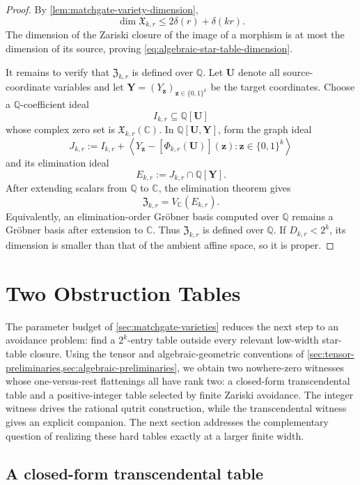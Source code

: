 \documentclass[11pt]{article}
\theoremstyle{definition}
\theoremstyle{remark}
\newcommand{\C}{\mathbb C}
\newcommand{\Q}{\mathbb Q}
\newcommand{\bits}{\{0,1\}}
\begin{document}
\begin{proof}
By \cref{lem:matchgate-variety-dimension},
\[
  \dim\mathfrak X_{k,r}
  \le2\delta(r)+\delta(kr).
\]
The dimension of the Zariski closure of the image of a morphism is at most
the dimension of its source, proving
\eqref{eq:algebraic-star-table-dimension}.

It remains to verify that $\mathfrak Z_{k,r}$ is defined over $\Q$.
Let $\mathbf U$ denote all source-coordinate variables and let
$\mathbf Y=(Y_{\boldsymbol z})_{\boldsymbol z\in\bits^k}$ be the target
coordinates.  Choose a
$\Q$-coefficient ideal
\[
  I_{k,r}\subseteq\Q[\mathbf U]
\]
whose complex zero set is $\mathfrak X_{k,r}(\C)$.  In
$\Q[\mathbf U,\mathbf Y]$, form the graph ideal
\[
  J_{k,r}
  :=I_{k,r}
  +\left\langle
    Y_{\boldsymbol z}-[\Phi_{k,r}(\mathbf U)](\boldsymbol z)
    :\boldsymbol z\in\bits^k
  \right\rangle
\]
and its elimination ideal
\[
  E_{k,r}:=J_{k,r}\cap\Q[\mathbf Y].
\]
After extending scalars from $\Q$ to $\C$, the elimination theorem gives
\[
  \mathfrak Z_{k,r}=V_{\C}(E_{k,r}).
\]
Equivalently, an elimination-order Gr\"obner basis computed over $\Q$
remains a Gr\"obner basis after extension to $\C$.  Thus
$\mathfrak Z_{k,r}$ is defined over $\Q$.  If $D_{k,r}<2^k$, its dimension
is smaller than that of the ambient affine space, so it is proper.
\end{proof}

\section{Two Obstruction Tables}
\label{sec:obstruction-tables}

The parameter budget of \cref{sec:matchgate-varieties} reduces the next step
to an avoidance problem: find a $2^k$-entry table outside every relevant
low-width star-table closure.  Using the tensor and algebraic-geometric
conventions of
\cref{sec:tensor-preliminaries,sec:algebraic-preliminaries}, we obtain two
nowhere-zero witnesses whose one-versus-rest flattenings all have rank two:
a closed-form transcendental table and a positive-integer table selected by
finite Zariski avoidance.  The integer witness drives the rational qutrit
construction, while the transcendental witness gives an explicit companion.
The next section addresses the complementary question of realizing these
hard tables exactly at a larger finite width.

\subsection{A closed-form transcendental table}
\label{sec:independent-table}
\end{document}
